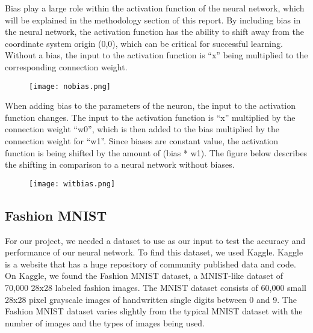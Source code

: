 \documentclass[twoside,twocolumn]{article}
\begin{document}
Bias play a large role within the activation function of the neural network, which will be explained in the methodology section of this report. By including bias in the neural network, the activation function has the ability to shift away from the coordinate system origin (0,0), which can be critical for successful learning. Without a bias, the input to the activation function is “x” being multiplied to the corresponding connection weight.\\
\begin{figure}[h]
    \centering
    \texttt{[image: nobias.png]}
\end{figure}
When adding bias to the parameters of the neuron, the input to the activation function changes. The input to the activation function is “x” multiplied by the connection weight “w0”, which is then added to the bias multiplied by the connection weight for “w1”. Since biases are constant value, the activation function is being shifted by the amount of (bias * w1). The figure below describes the shifting in comparison to a neural network without biases.\\
\begin{figure}[h]
    \centering
    \texttt{[image: witbias.png]}
\end{figure}

\subsection{Fashion MNIST}
For our project, we needed a dataset to use as our input to test the accuracy and performance of our neural network. To find this dataset, we used Kaggle. Kaggle is a website that has a huge repository of community published data and code. On Kaggle, we found the Fashion MNIST dataset, a MNIST-like dataset of 70,000 28x28 labeled fashion images. The MNIST dataset consists of 60,000 small 28x28 pixel grayscale images of handwritten single digits between 0 and 9. The Fashion MNIST dataset varies slightly from the typical MNIST dataset with the number of images and the types of images being used.\\
\end{document}
